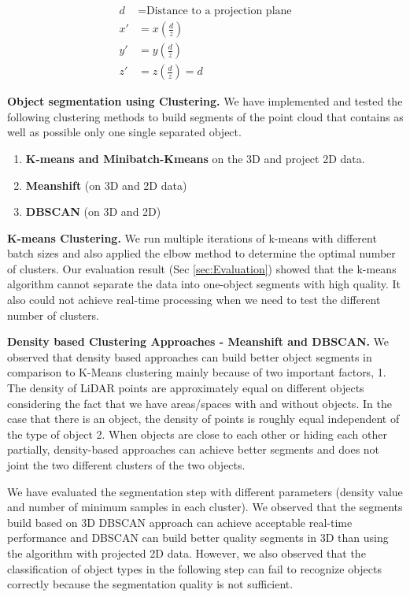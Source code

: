 \begin{align*}
d  & = \text{Distance to a projection plane} \\
x' & =  x (\frac{d}{z}) \\
y' & =  y (\frac{d}{z}) \\
z' & =  z (\frac{d}{z}) = d
\end{align*}



\textbf{Object segmentation using Clustering.} We have implemented and tested the following clustering methods to build segments of the point cloud that contains as well as possible only one single separated object.

\begin{enumerate}
  \item \textbf{K-means and Minibatch-Kmeans} on the 3D and project 2D data.
  \item \textbf{Meanshift} (on 3D and 2D data)
  \item \textbf{DBSCAN}  (on 3D and 2D)
\end{enumerate}

\textbf{K-means Clustering.} We run multiple iterations of k-means with different batch sizes and also applied the elbow method to determine the optimal number of clusters.
Our evaluation result (Sec \ref{sec:Evaluation}) showed that the k-means algorithm cannot separate the data into one-object segments with high quality. It also could not achieve real-time processing when we need to test the different number of clusters.

\textbf{Density based Clustering Approaches - Meanshift and DBSCAN.} We observed that density based approaches can build better object segments in comparison to K-Means clustering mainly because of two important factors, 1. The density of LiDAR points are approximately equal on different objects considering the fact that we have areas/spaces with and without objects. In the case that there is an object, the density of points is roughly equal independent of the type of object 2. When objects are close to each other or hiding each other partially, density-based approaches can achieve better segments and does not joint the two different clusters of the two objects.

We have evaluated the segmentation step with different parameters (density value and number of minimum samples in each cluster). We observed that the segments build based on 3D DBSCAN approach can achieve acceptable real-time performance and  DBSCAN can build better quality segments in 3D than using the algorithm with projected 2D data. However, we also observed that the classification of object types in the following step can fail to recognize objects correctly because the segmentation quality is not sufficient.


